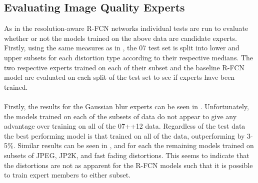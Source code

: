 \subsection{Evaluating Image Quality Experts}
As in the resolution-aware R-FCN networks individual tests are run to evaluate whether or not the models trained on the above data are candidate experts. Firstly, using the same measures as in , the 07 test set is split into lower and upper subsets for each distortion type according to their respective medians. The two respective experts trained on each of their subset and the baseline R-FCN model are evaluated on each split of the test set to see if experts have been trained.
\\\\
Firstly, the results for the Gaussian blur experts can be seen in . Unfortunately, the models trained on each of the subsets of data do not appear to give any advantage over training on all of the 07++12 data. Regardless of the test data the best performing model is that trained on all of the data, outperforming by 3-5\%. Similar results can be seen in ,  and  for each the remaining models trained on subsets of JPEG, JP2K, and fast fading distortions. This seems to indicate that the distortions are not as apparent for the R-FCN models such that it is possible to train expert members to either subset.

